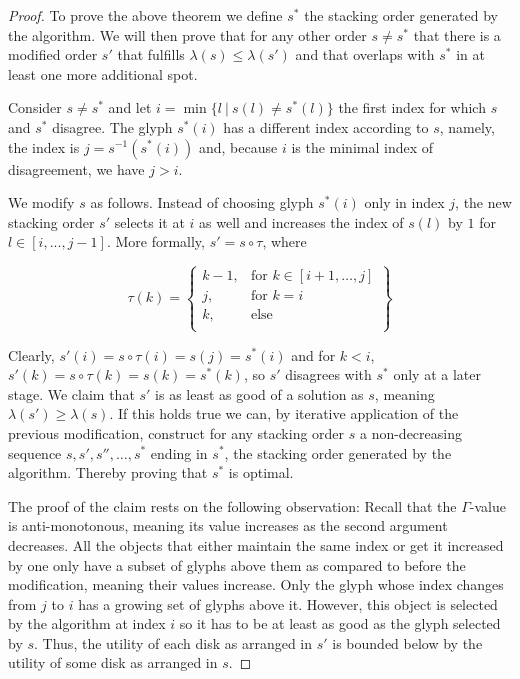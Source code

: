 \documentclass[a4paper,11pt]{article}
\begin{document}
\begin{proof}
  To prove the above theorem we define $s^*$ the stacking order generated by the algorithm. We will then prove that for any other order $s\neq s^*$ that there is a modified order $s'$ that fulfills $\lambda(s)\leq\lambda(s')$ and that overlaps with $s^*$ in at least one more additional spot.

  Consider $s\neq s^*$ and let $i=\min\{l\ |\ s(l)\neq s^*(l)\}$ the first index for which $s$ and $s^*$ disagree. The glyph $s^*(i)$ has a different index according to $s$, namely, the index is $j=s^{-1}(s^*(i))$ and, because $i$ is the minimal index of disagreement, we have $j>i$.

  We modify $s$ as follows. Instead of choosing glyph $s^*(i)$ only in index $j$, the new stacking order $s'$ selects it at $i$ as well and increases the index of $s(l)$ by $1$ for $l\in [i,...,j-1]$. More formally, $s'=s\circ \tau$, where

  \[
    \tau(k) = \left\{\begin{array}{ll}
	k-1, & \text{for } k\in [i+1,\dots,j]\\
	j, & \text{for } k=i\\
	k, & \text{else}\\
    \end{array}\right\}
  \]

  Clearly, $s'(i) = s\circ\tau(i) = s(j) = s^*(i)$ and for $k<i$, $s'(k) = s\circ\tau(k) = s(k) = s^*(k)$, so $s'$ disagrees with $s^*$ only at a later stage. We claim that $s'$ is as least as good of a solution as $s$, meaning $\lambda(s')\geq\lambda(s)$. If this holds true we can, by iterative application of the previous modification, construct for any stacking order $s$ a non-decreasing sequence $s, s', s'', \dots, s^*$ ending in $s^*$, the stacking order generated by the algorithm. Thereby proving that $s^*$ is optimal.

  The proof of the claim rests on the following observation: Recall that the $\Gamma$-value is anti-monotonous, meaning its value increases as the second argument decreases. All the objects that either maintain the same index or get it increased by one only have a subset of glyphs above them as compared to before the modification, meaning their values increase. Only the glyph whose index changes from $j$ to $i$ has a growing set of glyphs above it. However, this object is selected by the algorithm at index $i$ so it has to be at least as good as the glyph selected by $s$. Thus, the utility of each disk as arranged in $s'$ is bounded below by the utility of some disk as arranged in $s$.


\end{proof}
\end{document}
